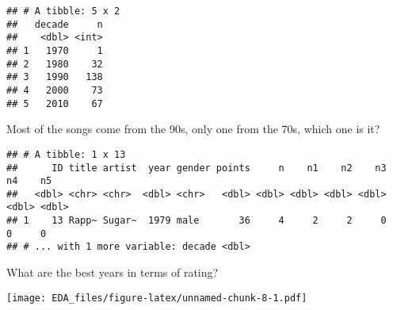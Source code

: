 \documentclass[
]{article}
\newenvironment{Shaded}{\begin{snugshade}}{\end{snugshade}}
\newcommand{\DataTypeTok}[1]{\textcolor[rgb]{0.13,0.29,0.53}{#1}}
\newcommand{\DecValTok}[1]{\textcolor[rgb]{0.00,0.00,0.81}{#1}}
\newcommand{\KeywordTok}[1]{\textcolor[rgb]{0.13,0.29,0.53}{\textbf{#1}}}
\newcommand{\NormalTok}[1]{#1}
\newcommand{\OperatorTok}[1]{\textcolor[rgb]{0.81,0.36,0.00}{\textbf{#1}}}
\newcommand{\StringTok}[1]{\textcolor[rgb]{0.31,0.60,0.02}{#1}}
\begin{document}
\begin{Shaded}
\end{Shaded}

\begin{verbatim}
## # A tibble: 5 x 2
##   decade     n
##    <dbl> <int>
## 1   1970     1
## 2   1980    32
## 3   1990   138
## 4   2000    73
## 5   2010    67
\end{verbatim}

Most of the songs come from the 90s, only one from the 70s, which one is
it?

\begin{Shaded}
\end{Shaded}

\begin{verbatim}
## # A tibble: 1 x 13
##      ID title artist  year gender points     n    n1    n2    n3    n4    n5
##   <dbl> <chr> <chr>  <dbl> <chr>   <dbl> <dbl> <dbl> <dbl> <dbl> <dbl> <dbl>
## 1    13 Rapp~ Sugar~  1979 male       36     4     2     2     0     0     0
## # ... with 1 more variable: decade <dbl>
\end{verbatim}

What are the best years in terms of rating?

\begin{Shaded}
\end{Shaded}

\texttt{[image: EDA\_files/figure-latex/unnamed-chunk-8-1.pdf]}
\end{document}
